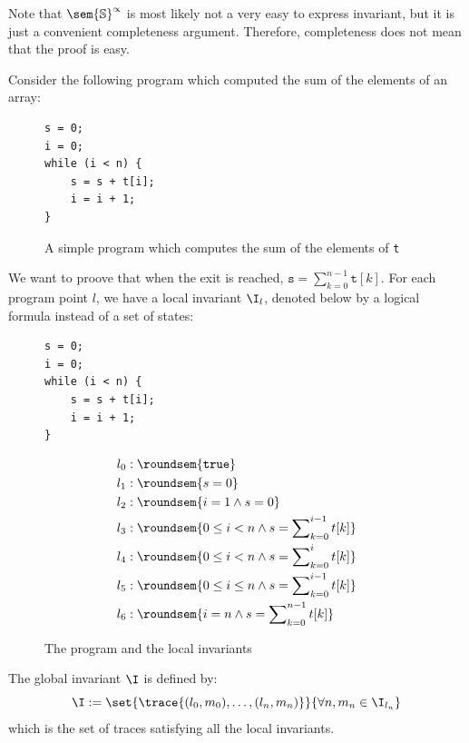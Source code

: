 \documentclass[toc, titlepaged]{../cs-classes/cs-classes}
\begin{document}
Note that $\sem{\S}^\propto$ is most likely not a very easy to express invariant, but it is just a convenient completeness argument. Therefore, completeness does not mean that the proof is easy.

\begin{example}
    Consider the following program which computed the sum of the elements of an array:
    \begin{figure}[!ht]
        \centering 
        \begin{minipage}{0.2\textwidth}
            \begin{verbatim}
s = 0;
i = 0;
while (i < n) {
    s = s + t[i];
    i = i + 1;
}
            \end{verbatim}
        \end{minipage}
        \caption{A simple program which computes the sum of the elements of \texttt{t}}
    \end{figure}
    We want to proove that when the exit is reached, $\texttt{s} = \sum_{k=0}^{n-1}\texttt{t}[k]$. For each program point $l$, we have a local invariant $\I_l$, denoted below by a logical formula instead of a set of states:
    \begin{figure}[!ht]
        \centering
        \begin{minipage}{0.2\textwidth}
            \baselineskip
            \centering
            \begin{verbatim}
s = 0;
i = 0;
while (i < n) {
    s = s + t[i];
    i = i + 1;
}
            \end{verbatim}
        \end{minipage}
        \begin{minipage}{.5\textwidth}
          \begin{equation*}
            \begin{aligned}
                l_0 &: \roundsem{\texttt{true}} \\
                l_1 &: \roundsem{s=0} \\
                l_2 &: \roundsem{i=1 \land s=0} \\
                l_3 &: \roundsem{0\leq i<n \land s = \sum\nolimits_{k=0}^{i-1}t[k]} \\
                l_4 &: \roundsem{0\leq i<n \land s = \sum\nolimits_{k=0}^i t[k]} \\
                l_5 &: \roundsem{0\leq i\leq n \land s = \sum\nolimits_{k=0}^{i-1}t[k]} \\
                l_6 &: \roundsem{i=n \land s = \sum\nolimits_{k=0}^{n-1}t[k]}
            \end{aligned}
          \end{equation*}
        \end{minipage}
        \caption{The program and the local invariants}
    \end{figure}

    The global invariant $\I$ is defined by:
    \begin{equation*}
        \I := \set{\trace{(l_0, m_0), \dots, (l_n, m_n)}}{\forall n, m_n\in \I_{l_n}}
    \end{equation*}
    which is the set of traces satisfying all the local invariants.
\end{example}
\end{document}

